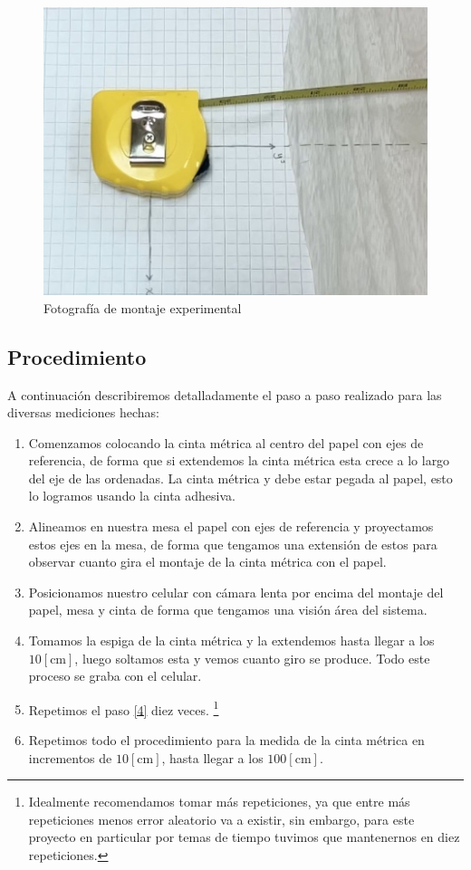 \documentclass{article}
\begin{document}
\begin{figure}[ht]
    \centering
    \includegraphics[scale=0.25]{Informe/img/montaje1.png}
    \caption{Fotografía de montaje experimental}
    \label{fig:montaje}
\end{figure}
    
\subsection{Procedimiento}
A continuación describiremos detalladamente el paso a paso realizado para las diversas mediciones hechas:

\begin{enumerate}
    \item Comenzamos colocando la cinta métrica al centro del papel con ejes de referencia, de forma que si extendemos la cinta métrica esta crece a lo largo del eje de las ordenadas. La cinta métrica y debe estar pegada al papel, esto lo logramos usando la cinta adhesiva.
    \item Alineamos en nuestra mesa el papel con ejes de referencia y proyectamos estos ejes en la mesa, de forma que tengamos una extensión de estos para observar cuanto gira el montaje de la cinta métrica con el papel. 
    \item Posicionamos nuestro celular con cámara lenta por encima del montaje del papel, mesa y cinta de forma que tengamos una visión área del sistema.
    \item Tomamos la espiga de la cinta métrica y la extendemos hasta llegar a los $10[\text{cm}]$, luego soltamos esta y vemos cuanto giro se produce. Todo este proceso se graba con el celular. \label{4} 
    \item Repetimos el paso \ref{4} diez veces. \footnote{Idealmente recomendamos tomar más repeticiones, ya que entre más repeticiones menos error aleatorio va a existir, sin embargo, para este proyecto en particular por temas de tiempo tuvimos que mantenernos en diez repeticiones.}
    \item Repetimos todo el procedimiento para la medida de la cinta métrica en incrementos de $10[\text{cm}]$, hasta llegar a los $100[\text{cm}]$.
\end{enumerate}
\end{document}
